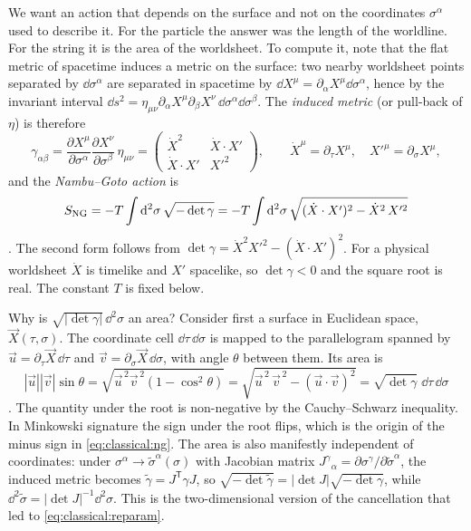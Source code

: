 We want an action that depends on the surface and not on the coordinates $\sigma^\alpha$ used
to describe it. For the particle the answer was the length of the worldline. For the string it
is the area of the worldsheet. To compute it, note that the flat metric of spacetime induces a
metric on the surface: two nearby worldsheet points separated by $\dd\sigma^\alpha$ are
separated in spacetime by $\dd X^\mu=\partial_\alpha X^\mu\dd\sigma^\alpha$, hence by the
invariant interval $\dd s^2=\eta_{\mu\nu}\partial_\alpha X^\mu\partial_\beta X^\nu\,
\dd\sigma^\alpha\dd\sigma^\beta$. The \emph{induced metric} (or pull-back
of $\eta$) is therefore
\begin{equation}\label{eq:classical:induced}
  \gamma_{\alpha\beta}=\frac{\partial X^\mu}{\partial\sigma^\alpha}\frac{\partial X^\nu}{\partial\sigma^\beta}\,\eta_{\mu\nu}
  =\begin{pmatrix}\dot X^2 & \dot X\cdot X'\\ \dot X\cdot X' & X'^2\end{pmatrix},
  \qquad \dot X^\mu=\partial_\tau X^\mu,\quad X'^\mu=\partial_\sigma X^\mu,
\end{equation}
and the \emph{Nambu--Goto action} is
\begin{equation}\label{eq:classical:ng}
  S_{\rm NG}=-T\int\mathrm{d}^2\sigma\,\sqrt{-\det\gamma}
   =-T\int\mathrm{d}^2\sigma\,\sqrt{(\dot X\cdot X')^2-\dot X^2\,X'^2}
\end{equation}
. The second form follows from $\det\gamma=\dot X^2X'^2-(\dot
X\cdot X')^2$. For a physical worldsheet $\dot X$ is timelike and $X'$ spacelike, so
$\det\gamma<0$ and the square root is real. The constant $T$ is fixed below.

Why is $\sqrt{|\det\gamma|}\,\dd^2\sigma$ an area? Consider first a surface in Euclidean space,
$\vec X(\tau,\sigma)$. The coordinate cell $\dd\tau\,\dd\sigma$ is mapped to the parallelogram
spanned by $\vec u=\partial_\tau\vec X\,\dd\tau$ and $\vec v=\partial_\sigma\vec X\,\dd\sigma$, with
angle $\theta$ between them. Its area is
\begin{equation}\label{eq:classical:area}
  |\vec u||\vec v|\sin\theta=\sqrt{\vec u^{\,2}\vec v^{\,2}(1-\cos^2\theta)}
   =\sqrt{\vec u^{\,2}\,\vec v^{\,2}-(\vec u\cdot\vec v)^2}
   =\sqrt{\det\gamma}\;\dd\tau\,\dd\sigma
\end{equation}
. The quantity under the root is non-negative by the
Cauchy--Schwarz inequality. In Minkowski signature the sign under the root flips, which is the
origin of the minus sign in \eqref{eq:classical:ng}. The area is also manifestly independent of
coordinates: under $\sigma^\alpha\to\tilde\sigma^\alpha(\sigma)$ with Jacobian matrix
$J^\gamma{}_\alpha=\partial\sigma^\gamma/\partial\tilde\sigma^\alpha$, the induced metric
becomes $\tilde\gamma=J^{\mathsf T}\gamma J$, so $\sqrt{-\det\tilde\gamma}=|\det
J|\sqrt{-\det\gamma}$, while $\dd^2\tilde\sigma=|\det J|^{-1}\dd^2\sigma$. This is the
two-dimensional version of the cancellation that led to \eqref{eq:classical:reparam}.

